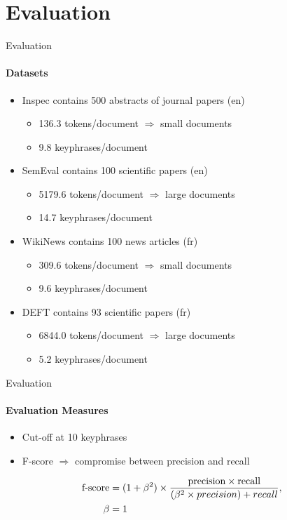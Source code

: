 \section{Evaluation}
  \begin{frame}{Evaluation}
    \framesubtitle{Datasets}

    \begin{itemize}
      \item<+->{Inspec contains 500 abstracts of journal papers (en)}
      \begin{itemize}
        \item{136.3 tokens/document $\Rightarrow$ small documents}
        \item{9.8 keyphrases/document}
      \end{itemize}
      \item<+->{SemEval contains 100 scientific papers (en)}
      \begin{itemize}
        \item{5179.6 tokens/document $\Rightarrow$ large documents}
        \item{14.7 keyphrases/document}
      \end{itemize}
      \item<+->{WikiNews contains 100 news articles (fr)}
      \begin{itemize}
        \item{309.6 tokens/document $\Rightarrow$ small documents}
        \item{9.6 keyphrases/document}
      \end{itemize}
      \item<+->{DEFT contains 93 scientific papers (fr)}
      \begin{itemize}
        \item{6844.0 tokens/document $\Rightarrow$ large documents}
        \item{5.2 keyphrases/document}
      \end{itemize}
    \end{itemize}
  \end{frame}

  \begin{frame}{Evaluation}
    \framesubtitle{Evaluation Measures}

    \begin{itemize}
      \item{Cut-off at 10 keyphrases}
      \item{F-score $\Rightarrow$ compromise between precision and recall}
    \end{itemize}

    \begin{align}
      \text{f-score} &= (1 + \beta^2) \times \frac{\text{precision} \times \text{recall}}{(\beta^2 \times precision) + recall}, \notag\\
      \beta &= 1 \notag
    \end{align}
  \end{frame}

